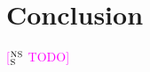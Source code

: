 \documentclass[11pt]{article}
\newcommand{\ensuretext}[1]{#1}
\newcommand{\nssmarker}{\ensuretext{\textcolor{magenta}{\ensuremath{^{\textsc{NS}}_{\textsc{S}}}}}}
\newcommand{\arkcomment}[3]{\ensuretext{\textcolor{#3}{[#1 #2]}}}
\newcommand{\nss}[1]{\arkcomment{\nssmarker}{#1}{magenta}}
\begin{document}
\section{Conclusion}

\nss{TODO}


\setlength{\bibsep}{10pt}
{\fontsize{10}{12.25}\selectfont
}
\end{document}
